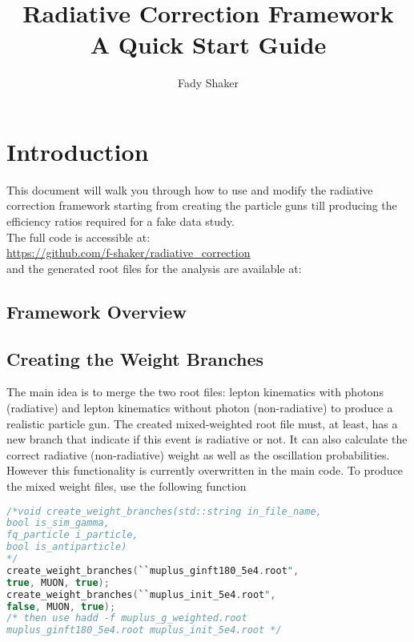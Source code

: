 \documentclass[12pt]{report}
\title{Radiative Correction Framework\\ A Quick Start Guide}
\author{Fady Shaker}
\begin{document}
\maketitle
\tableofcontents
\newpage
\section{Introduction}
This document will walk you through how to use and modify the radiative correction framework starting from creating the particle guns till producing the efficiency ratios required for a fake data study.\\

The full code is accessible at:\\
\url{https://github.com/f-shaker/radiative_correction}\\
and the generated root files for the analysis are available at:\\

\subsection{Framework Overview}
\begin{figure}[!ht]
\end{figure}

\subsection{Creating the Weight Branches}
The main idea is to merge the two root files: lepton kinematics with photons (radiative) and lepton kinematics without photon (non-radiative) to produce a realistic particle gun. The created mixed-weighted root file must, at least, has a new branch that indicate if this event is radiative or not. It can also calculate the correct radiative (non-radiative) weight as well as the oscillation probabilities. However this functionality is currently overwritten in the main code.
To produce the mixed weight files, use the following function 
\begin{lstlisting}[language=C++, caption=Creating Weight Branch Example]
/*void create_weight_branches(std::string in_file_name,
bool is_sim_gamma,
fq_particle i_particle,
bool is_antiparticle)
*/
create_weight_branches(``muplus_ginft180_5e4.root",
true, MUON, true);
create_weight_branches(``muplus_init_5e4.root",
false, MUON, true);
/* then use hadd -f muplus_g_weighted.root
muplus_ginft180_5e4.root muplus_init_5e4.root */							
\end{lstlisting} 
\end{document}
